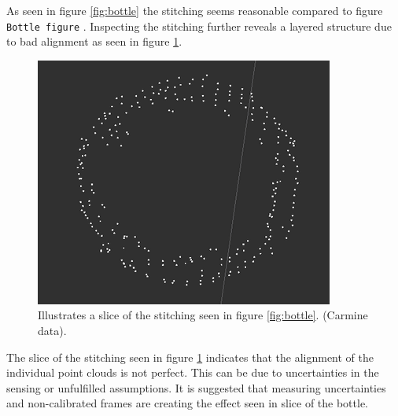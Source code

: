 \noindent As seen in figure \ref{fig:bottle} the stitching seems reasonable compared to figure \texttt{Bottle figure} . Inspecting the stitching further reveals a layered structure due to bad alignment as seen in figure \ref{fig:bottle_slice}.

\begin{figure}[htb]
	\begin{center}
		\includegraphics[scale=0.7,trim=0 0 0 0]{graphics/07_modelling/slice.png}%
		\caption{Illustrates a slice of the stitching seen in figure \ref{fig:bottle}. (Carmine data).}
		\label{fig:bottle_slice}
	\end{center}
\end{figure}

\noindent The slice of the stitching seen in figure \ref{fig:bottle_slice} indicates that the alignment of the individual point clouds is not perfect. This can be due to uncertainties in the sensing or unfulfilled assumptions. It is suggested that measuring uncertainties and non-calibrated frames are creating the effect seen in slice of the bottle.\\
